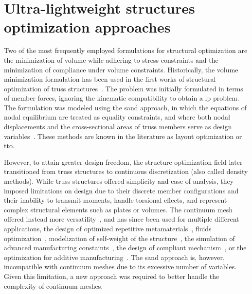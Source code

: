 \section{Ultra-lightweight structures optimization approaches}

Two of the most frequently employed formulations for structural optimization are the minimization of volume while adhering to stress constraints and the minimization of compliance under volume constraints. Historically, the volume minimization formulation has been used in the first works of structural optimization of truss structures~. The problem was initially formulated in terms of member forces, ignoring the kinematic compatibility to obtain a \gls{lp} problem. The formulation was modeled using the \gls{sand} approach, in which the equations of nodal equilibrium are treated as equality constraints, and where both nodal displacements and the cross-sectional areas of truss members serve as design variables~. These methods are known in the literature as layout optimization or \gls{tto}. 

However, to attain greater design freedom, the structure optimization field later transitioned from truss structures to continuous discretization (also called density methods). While truss structures offered simplicity and ease of analysis, they imposed limitations on design due to their discrete member configurations and their inability to transmit moments, handle torsional effects, and represent complex structural elements such as plates or volumes. The continuum mesh offered instead more versatility~, and has since been used for multiple different applications, \eg the design of optimized repetitive metamaterials~, fluids optimization~, modelization of self-weight of the structure~, the simulation of advanced manufacturing constaints~, the design of compliant mechanism~, or the optimization for additive manufacturing~. The \gls{sand} approach is, however, incompatible with continuum meshes due to its excessive number of variables. Given this limitation, a new approach was required to better handle the complexity of continuum meshes.


